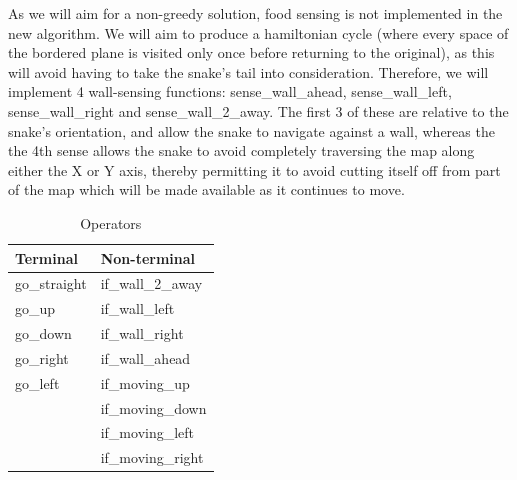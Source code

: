 \documentclass[british,10pt,a4paper]{article}
\begin{document}
As we will aim for a non-greedy solution, food sensing is not implemented in the new algorithm. We will aim to produce a hamiltonian cycle (where every space of the bordered plane is visited only once before returning to the original), as this will avoid having to take the snake's tail into consideration. Therefore, we will implement 4 wall-sensing functions: sense\_wall\_ahead, sense\_wall\_left, sense\_wall\_right and sense\_wall\_2\_away. The first 3 of these are relative to the snake's orientation, and allow the snake to navigate against a wall, whereas the the 4th sense allows the snake to avoid completely traversing the map along either the X or Y axis, thereby permitting it to avoid cutting itself off from part of the map which will be made available as it continues to move. \newline

\begin{table}
	\centering
	\begin{tabular}{|l|l|}
		\hline
		\textbf{Terminal} & \textbf{Non-terminal} \\ \hline
		go\_straight      & if\_wall\_2\_away     \\ \hline
		go\_up            & if\_wall\_left        \\ \hline
		go\_down          & if\_wall\_right       \\ \hline
		go\_right         & if\_wall\_ahead       \\ \hline
		go\_left          & if\_moving\_up        \\ \hline
		                  & if\_moving\_down      \\ \hline
		                  & if\_moving\_left      \\ \hline
		                  & if\_moving\_right     \\ \hline
	\end{tabular}
	\caption{Operators}
	\label{tab:operators}
\end{table}
\end{document}
